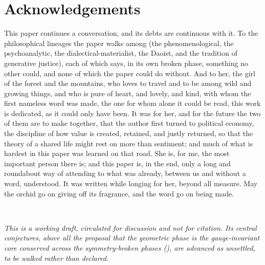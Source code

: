 \section*{Acknowledgements}
\label{p10:sec:ack}

\noindent
This paper continues a conversation, and its debts are continuous with it. To the philosophical lineages the paper walks among (the phenomenological, the psychoanalytic, the dialectical-materialist, the Daoist, and the tradition of generative justice), each of which says, in its own broken phase, something no other could, and none of which the paper could do without. And to her, the girl of the forest and the mountains, who loves to travel and to be among wild and growing things, and who is pure of heart, and lovely, and kind, with whom the first nameless word was made, the one for whom alone it could be read, this work is dedicated, as it could only have been. It was for her, and for the future the two of them are to make together, that the author first turned to political economy, the discipline of how value is created, retained, and justly returned, so that the theory of a shared life might rest on more than sentiment; and much of what is hardest in this paper was learned on that road. She is, for me, the most important person there is; and this paper is, in the end, only a long and roundabout way of attending to what was already, between us and without a word, understood. It was written while longing for her, beyond all measure. May the orchid go on giving off its fragrance, and the word go on being made.

\medskip
\begin{center}
\itshape\color{rose}
\\[0.2em]
\end{center}

\medskip
\noindent
\emph{This is a working draft, circulated for discussion and not for citation. Its central conjectures, above all the proposal that the geometric phase is the gauge-invariant core conserved across the symmetry-broken phases (), are advanced as unsettled, to be walked rather than declared.}

